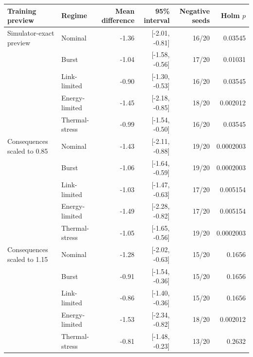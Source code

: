 \begin{tabular}{llrrrr}
\toprule
Training preview & Regime & Mean difference & 95\% interval & Negative seeds & Holm $p$ \\
\midrule
Simulator-exact preview & Nominal & -1.36 & [-2.01, -0.81] & 16/20 & 0.03545 \\
 & Burst & -1.04 & [-1.58, -0.56] & 17/20 & 0.01031 \\
 & Link-limited & -0.90 & [-1.30, -0.53] & 16/20 & 0.03545 \\
 & Energy-limited & -1.45 & [-2.18, -0.85] & 18/20 & 0.002012 \\
 & Thermal-stress & -0.99 & [-1.54, -0.50] & 16/20 & 0.03545 \\
\addlinespace
Consequences scaled to 0.85 & Nominal & -1.43 & [-2.11, -0.88] & 19/20 & 0.0002003 \\
 & Burst & -1.06 & [-1.64, -0.59] & 19/20 & 0.0002003 \\
 & Link-limited & -1.03 & [-1.47, -0.63] & 17/20 & 0.005154 \\
 & Energy-limited & -1.49 & [-2.28, -0.82] & 17/20 & 0.005154 \\
 & Thermal-stress & -1.05 & [-1.65, -0.56] & 19/20 & 0.0002003 \\
\addlinespace
Consequences scaled to 1.15 & Nominal & -1.28 & [-2.02, -0.63] & 15/20 & 0.1656 \\
 & Burst & -0.91 & [-1.54, -0.36] & 15/20 & 0.1656 \\
 & Link-limited & -0.86 & [-1.40, -0.36] & 15/20 & 0.1656 \\
 & Energy-limited & -1.53 & [-2.34, -0.82] & 18/20 & 0.002012 \\
 & Thermal-stress & -0.81 & [-1.48, -0.23] & 13/20 & 0.2632 \\
\bottomrule
\end{tabular}